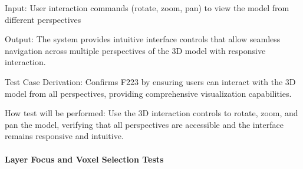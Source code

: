 \documentclass[12pt, titlepage]{article}
\begin{document}
\begin{enumerate}
Input: User interaction commands (rotate, zoom, pan) to view the model from different perspectives
					
Output: The system provides intuitive interface controls that allow seamless navigation
across multiple perspectives of the 3D model with responsive interaction.

Test Case Derivation: Confirms F223 by ensuring users can interact with the 3D model
from all perspectives, providing comprehensive visualization capabilities.
					
How test will be performed: Use the 3D interaction controls to rotate, zoom, and pan
the model, verifying that all perspectives are accessible and the interface remains
responsive and intuitive.

\end{enumerate}

\paragraph{Layer Focus and Voxel Selection Tests}
\end{document}
